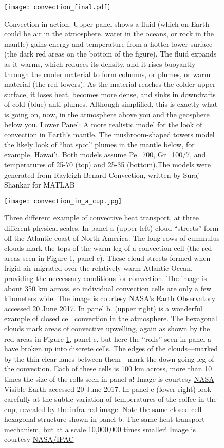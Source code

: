 \begin{figure}[p]
\centering
\texttt{[image: convection\_final.pdf]}%
\caption{Convection in action. Upper panel shows a fluid (which on Earth could be air in the atmosphere, water in the oceans, or rock in the mantle) gains energy and temperature from a hotter lower surface (the dark red areas on the bottom of the figure). The fluid expands as it warms, which reduces its density, and it rises buoyantly through the cooler material to form columns, or plumes, or warm material (the red towers). As the material reaches the colder upper surface, it loses heat, becomes more dense, and sinks in downdrafts of cold (blue) anti-plumes. Although simplified, this is exactly what is going on, now, in the atmosphere above you and the geosphere below you. Lower Panel: A more realistic model for the look of convection in Earth's mantle. The mushroom-shaped towers model the likely look of ``hot spot'' plumes in the mantle below, for example, Hawai'i. Both models assume Pe=700, Gr=100/7, and temperatures of 25-70 (top) and 25-35 (bottom).The models were generated from Rayleigh Benard Convection, written by Suraj Shankar for MATLAB}
\label{fig:convection_final}
\end{figure}

\begin{figure}[p]
\centering
\texttt{[image: convection\_in\_a\_cup.jpg]}%
\caption{Three different example of convective heat transport, at three different physical scales. In panel a (upper left) cloud ``streets'' form off the Atlantic coast of North America. The long rows of cummulus clouds mark the tops of the warm leg of a convection cell (the red areas seen in Figure \ref{fig:convection_final}, panel c). These cloud streets formed when frigid air migrated over the relatively warm Atlantic Ocean, providing the neccessary conditions for convection. The image is about 350 km across, so individual convection cells are only a few kilometers wide. The image is courtesy \href{https://earthobservatory.nasa.gov/NaturalHazards/view.php?id=82800}{NASA's Earth Observatory} accessed 20 June 2017. In panel b. (upper right) is a wonderful example of closed cell convection in the atmosphere. The hexagonal clouds mark areas of convective upwelling, again as shown by the red areas in Figure \ref{fig:convection_final}, panel c, but here the ``rolls'' seen in panel a have broken up into discrete cells. The edges of the clouds---marked by the thin clear lanes between them---mark the down-going leg of the convection. Each of these cells is 100 km across, more than 10 times the size of the rolls seen in panel a! Image is courtesy \href{https://visibleearth.nasa.gov/view.php?id=59758}{NASA Visible Earth} accessed 20 June 2017. In panel c (lower right) look carefully at the subtle variation of temperatures of the coffee in the cup, revealed by the infra-red image. Note the same closed cell hexagonal structure shown in panel b. The same heat transport mechanism, but at a scale 10,000,000 times smaller! Image is courtesy \href{http://coolcosmos.ipac.caltech.edu/cosmic_kids/learn_ir/}{NASA/IPAC}}
\label{fig:convection_in_a_cup}
\end{figure}


